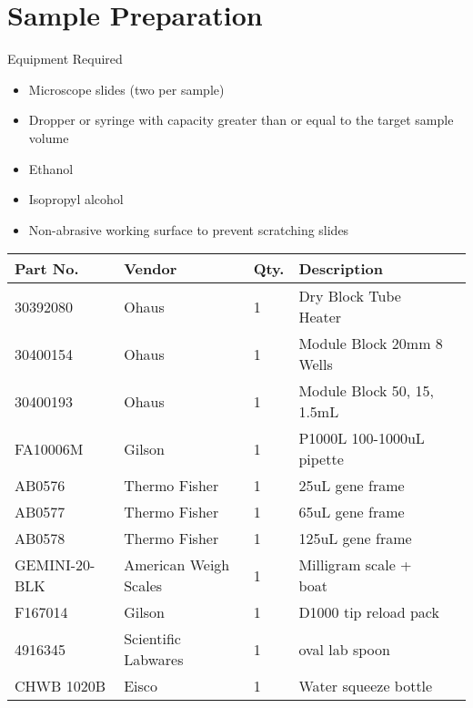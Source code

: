 \section{Sample Preparation}

Equipment Required
\begin{itemize}
    \item Microscope slides (two per sample)
    \item Dropper or syringe with capacity greater than or equal to the target sample volume
    \item Ethanol
    \item Isopropyl alcohol
    \item Non-abrasive working surface to prevent scratching slides
\end{itemize}

\begin{tabular}{ l l l l l }
    \toprule[2pt]
    \textbf{Part No.} & \textbf{Vendor} & \textbf{Qty.} & \textbf{Description} \\
    \midrule[0.75pt]
    30392080 & Ohaus & 1 & Dry Block Tube Heater \\
     
    30400154 & Ohaus & 1 & Module Block 20mm 8 Wells \\

    30400193 & Ohaus & 1 & Module Block 50, 15, 1.5mL \\
     
    FA10006M & Gilson & 1 & P1000L 100-1000uL pipette \\
     
    AB0576 & Thermo Fisher & 1 & 25uL gene frame \\

    AB0577 & Thermo Fisher & 1 & 65uL gene frame \\

    AB0578 & Thermo Fisher & 1 & 125uL gene frame \\
     
    GEMINI-20-BLK & American Weigh Scales & 1 & Milligram scale + boat \\
     
    F167014 & Gilson & 1 & D1000 tip reload pack \\

    4916345 & Scientific Labwares & 1 & oval lab spoon \\

    CHWB 1020B & Eisco & 1 & Water squeeze bottle \\


\end{tabular}
